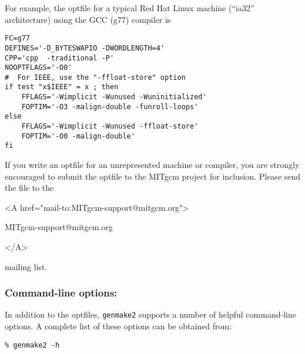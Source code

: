 For example, the optfile for a typical Red Hat Linux machine (``ia32''
architecture) using the GCC (g77) compiler is
\begin{verbatim}
FC=g77
DEFINES='-D_BYTESWAPIO -DWORDLENGTH=4'
CPP='cpp  -traditional -P'
NOOPTFLAGS='-O0'
#  For IEEE, use the "-ffloat-store" option
if test "x$IEEE" = x ; then
    FFLAGS='-Wimplicit -Wunused -Wuninitialized'
    FOPTIM='-O3 -malign-double -funroll-loops'
else
    FFLAGS='-Wimplicit -Wunused -ffloat-store'
    FOPTIM='-O0 -malign-double'
fi
\end{verbatim}

If you write an optfile for an unrepresented machine or compiler, you
are strongly encouraged to submit the optfile to the MITgcm project
for inclusion.  Please send the file to the
\begin{rawhtml} <A href="mail-to:MITgcm-support@mitgcm.org"> \end{rawhtml}
\begin{center}
  MITgcm-support@mitgcm.org
\end{center}
\begin{rawhtml} </A> \end{rawhtml}
mailing list.

\subsubsection{Command-line options:}

In addition to the optfiles, \texttt{genmake2} supports a number of
helpful command-line options.  A complete list of these options can be
obtained from:
\begin{verbatim}
% genmake2 -h
\end{verbatim}

